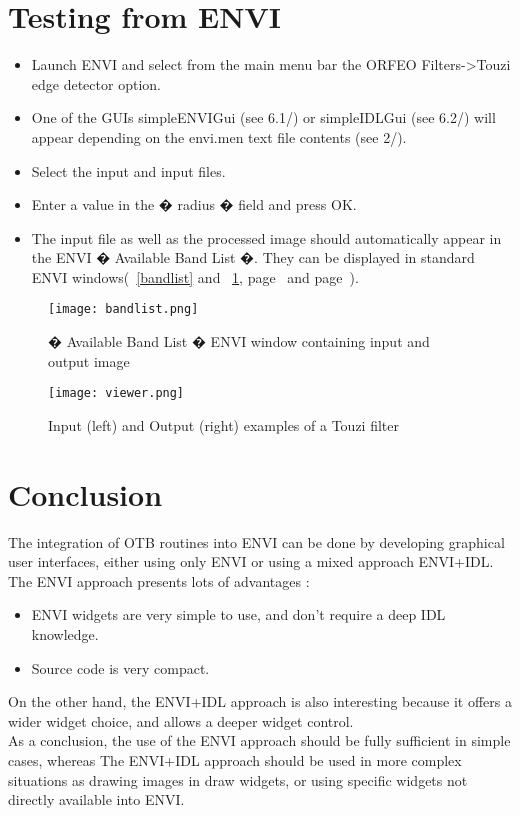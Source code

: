 \section{Testing from ENVI}
\begin{itemize}
    \item Launch ENVI and select from the main menu bar the ORFEO Filters->Touzi edge detector option.
    \item One of the GUIs simpleENVIGui (see 6.1/) or simpleIDLGui (see 6.2/) will appear depending on the envi.men text file contents (see 2/). 
    \item Select the input and input files. 
    \item Enter a value in the � radius � field and press OK.
    \item The input file as well as the processed image should automatically appear in the ENVI � Available Band List �. 
          They can be displayed in standard ENVI windows(~\ref{bandlist} and ~\ref{viewer}, page~\pageref{bandlist} and page~\pageref{viewer}).
\end{itemize}

\begin{figure}
    \begin{minipage}[b]{.46\linewidth}
        \centering\texttt{[image: bandlist.png]}
        \caption{� Available Band List � ENVI window containing input and output image}
        \label{bandlist}
    \end{minipage} \hfill
    \begin{minipage}[b]{.46\linewidth}
        \centering\texttt{[image: viewer.png]}
        \caption{Input (left) and Output (right)  examples of a Touzi filter}
        \label{viewer}
    \end{minipage}
\end{figure}

\section{Conclusion}
The integration of OTB routines into ENVI can be done by developing graphical user interfaces, either using only ENVI or using a mixed approach ENVI+IDL. 
The ENVI approach presents lots of advantages :
\begin{itemize}
    \item ENVI widgets are very simple to use, and don't require a deep IDL knowledge.
    \item Source code is very compact.
\end{itemize}

On the other hand, the ENVI+IDL approach is also interesting because it offers a wider widget choice, and allows a deeper widget control.
\\
As a conclusion, the use of the ENVI approach should be fully sufficient in simple cases, whereas The ENVI+IDL approach should be used in more complex situations as drawing images in draw widgets, or using specific widgets not directly available into ENVI.

